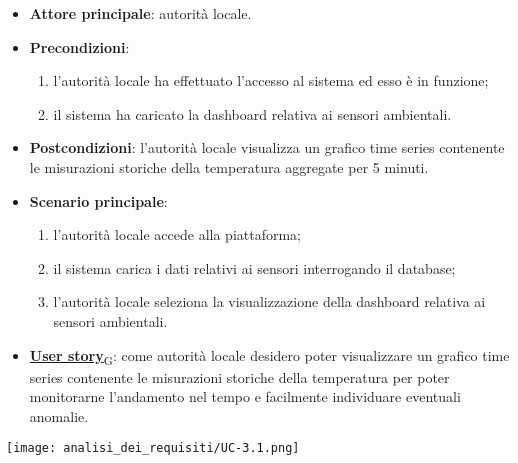 \begin{itemize}
	\item \textbf{Attore principale}: autorità locale.
	\item \textbf{Precondizioni}:
	      \begin{enumerate}
		      \item l'autorità locale ha effettuato l'accesso al sistema ed esso è in funzione;
		      \item il sistema ha caricato la dashboard relativa ai sensori ambientali.
	      \end{enumerate}
	\item \textbf{Postcondizioni}: l'autorità locale visualizza un grafico time series contenente le misurazioni storiche
	      della temperatura aggregate per 5 minuti.
	\item \textbf{Scenario principale}:
	      \begin{enumerate}
		      \item l'autorità locale accede alla piattaforma;
		      \item il sistema carica i dati relativi ai sensori interrogando il database;
		      \item l'autorità locale seleziona la visualizzazione della dashboard relativa ai sensori ambientali.
	      \end{enumerate}
	\item \href{https://7last.github.io/docs/pb/documentazione-interna/glossario\#user-story}{\textbf{User story}\textsubscript{G}}: come autorità locale desidero poter visualizzare un grafico time series contenente le misurazioni storiche della temperatura
	      per poter monitorarne l'andamento nel tempo e facilmente individuare eventuali anomalie.
\end{itemize}
\begin{center}
	\texttt{[image: analisi\_dei\_requisiti/UC-3.1.png]}
\end{center}


